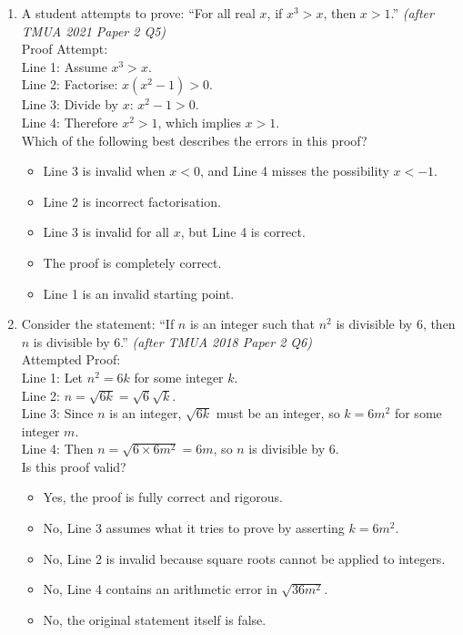 \documentclass[11pt,a4paper]{article}
\begin{document}
\begin{enumerate}

\item A student attempts to prove: ``For all real $x$, if $x^3 > x$, then $x > 1$.'' \textit{\small(after TMUA 2021 Paper 2 Q5)}\\
Proof Attempt:\\
Line 1: Assume $x^3 > x$.\\
Line 2: Factorise: $x(x^2 - 1) > 0$.\\
Line 3: Divide by $x$: $x^2 - 1 > 0$.\\
Line 4: Therefore $x^2 > 1$, which implies $x > 1$.\\
Which of the following best describes the errors in this proof?
\begin{itemize}
\item[A)] Line 3 is invalid when $x < 0$, and Line 4 misses the possibility $x < -1$.
\item[B)] Line 2 is incorrect factorisation.
\item[C)] Line 3 is invalid for all $x$, but Line 4 is correct.
\item[D)] The proof is completely correct.
\item[E)] Line 1 is an invalid starting point.
\end{itemize}

\item Consider the statement: ``If $n$ is an integer such that $n^2$ is divisible by $6$, then $n$ is divisible by $6$.'' \textit{\small(after TMUA 2018 Paper 2 Q6)}\\
Attempted Proof:\\
Line 1: Let $n^2 = 6k$ for some integer $k$.\\
Line 2: $n = \sqrt{6k} = \sqrt{6}\sqrt{k}$.\\
Line 3: Since $n$ is an integer, $\sqrt{6k}$ must be an integer, so $k = 6m^2$ for some integer $m$.\\
Line 4: Then $n = \sqrt{6 \times 6m^2} = 6m$, so $n$ is divisible by $6$.\\
Is this proof valid?
\begin{itemize}
\item[A)] Yes, the proof is fully correct and rigorous.
\item[B)] No, Line 3 assumes what it tries to prove by asserting $k = 6m^2$.
\item[C)] No, Line 2 is invalid because square roots cannot be applied to integers.
\item[D)] No, Line 4 contains an arithmetic error in $\sqrt{36m^2}$.
\item[E)] No, the original statement itself is false.
\end{itemize}


\end{enumerate}
\end{document}
